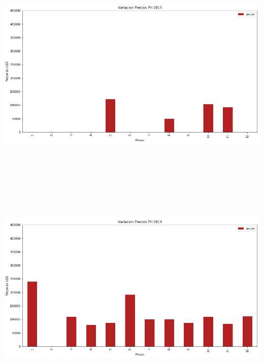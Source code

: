 \documentclass[a4paper, 10pt]{article}
\begin{document}
    \begin{center}
          \includegraphics[width=6in, height=4.2in]{images/vPH2013}
    \end{center}
    \begin{center}
          \includegraphics[width=6in, height=4.2in]{images/vPH2014}
    \end{center}
\end{document}
